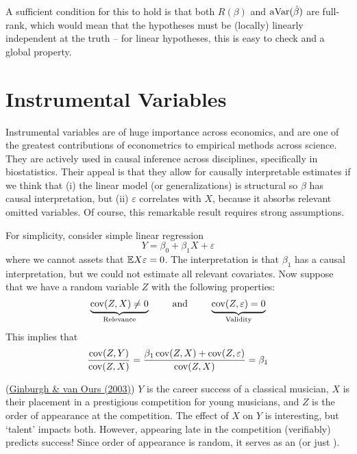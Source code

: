 \documentclass[10pt]{article}
\begin{document}
\begin{remark}A sufficient condition for this to hold is that both $R(\beta)$ and $\mathop{\rm aVar}(\hat{\beta})$ are full-rank, which would mean that the hypotheses must be (locally) linearly independent at the truth -- for linear hypotheses, this is easy to check and a global property. \end{remark}

\newpage
\section{Instrumental Variables}

\begin{remark}
	Instrumental variables are of huge importance across economics, and are one of the greatest contributions of econometrics to empirical methods across science. They are actively used in causal inference across disciplines, specifically in biostatistics. Their appeal is that they allow for causally interpretable estimates if we think that (i) the linear model (or generalizations) is structural so $\beta$ has causal interpretation, but (ii) $\varepsilon$ correlates with $X$, because it absorbs relevant omitted variables. Of course, this remarkable result requires strong assumptions.
\end{remark}

\begin{model}
	For simplicity, consider simple linear regression \[Y = \beta_0 + \beta_1 X + \varepsilon\]where we cannot assets that $\mathbb{E} X\varepsilon = 0$. The interpretation is that $\beta_1$ has a causal interpretation, but we could not estimate all relevant covariates. Now suppose that we have a random variable $Z$ with the following properties:\[\underbrace{\mathop{\rm cov}(Z,X) \ne 0}_{\text{Relevance}}\qquad \text{ and } \qquad \underbrace{\mathop{\rm cov}(Z,\varepsilon) = 0}_{\text{Validity}}\]This implies that \[\frac{\mathop{\rm cov}(Z,Y)}{\mathop{\rm cov}(Z,X)} = \frac{\beta_1 \mathop{\rm cov}(Z,X) + \mathop{\rm cov}(Z,\varepsilon)}{\mathop{\rm cov}(Z,X)} = \beta_1\]
\end{model}

\begin{example}
	(\href{https://www.aeaweb.org/articles?id=10.1257/000282803321455296}{Ginburgh \& van Ours (2003)}) $Y$ is the career success of a classical musician, $X$ is their placement in a prestigious competition for young musicians, and $Z$ is the order of appearance at the competition. The effect of $X$ on $Y$ is interesting, but `talent' impacts both. However, appearing late in the competition (verifiably) predicts success! Since order of appearance is random, it serves as an  (or just ).
\end{example}
\end{document}
